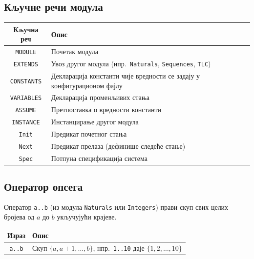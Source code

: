 \subsection{Кључне речи модула}
\begin{center}
\begin{tabularx}{\textwidth}{|c|X|}
\hline
\textbf{Кључна реч} & \textbf{Опис} \\
\hline
\texttt{MODULE}     & Почетак модула \\
\texttt{EXTENDS}    & Увоз другог модула (нпр.\ \texttt{Naturals}, \texttt{Sequences}, \texttt{TLC}) \\
\texttt{CONSTANTS}  & Декларација константи чије вредности се задају у конфигурационом фајлу \\
\texttt{VARIABLES}  & Декларација променљивих стања \\
\texttt{ASSUME}     & Претпоставка о вредности константи \\
\texttt{INSTANCE}   & Инстанцирање другог модула \\
\texttt{Init}       & Предикат почетног стања \\
\texttt{Next}       & Предикат прелаза (дефинише следеће стање) \\
\texttt{Spec}       & Потпуна спецификација система \\
\hline
\end{tabularx}
\end{center}

\subsection{Оператор опсега}
Оператор \texttt{a..b} (из модула \texttt{Naturals} или \texttt{Integers}) прави скуп свих целих бројева од $a$ до $b$ укључујући крајеве.
\begin{center}
\begin{tabularx}{\textwidth}{|c|X|}
\hline
\textbf{Израз} & \textbf{Опис} \\
\hline
\texttt{a..b} & Скуп $\{a, a+1, \ldots, b\}$, нпр.\ \texttt{1..10} даје $\{1,2,\ldots,10\}$ \\
\hline
\end{tabularx}
\end{center}

